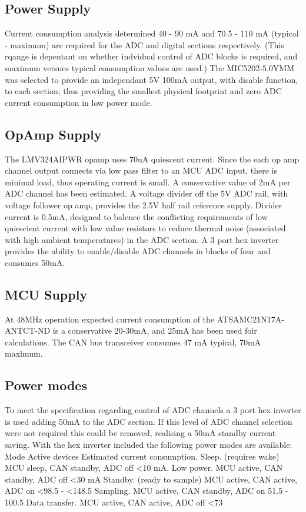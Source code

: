 \subsection{Power Supply}
Current consumption analysis determined 40 - 90 mA and 70.5 - 110 mA (typical - maximum) are required for the ADC and digital sections respectively. (This rqange is depentant on whether indvidual control of ADC blocks is required, and maximum versues typical consumption values are used.) 
The MIC5202-5.0YMM was selected to provide an independant 5V 100mA output, with disable function, to each section; thus providing the smallest physical footprint and zero ADC current consumption in low power mode.
 
\subsection{OpAmp Supply}
The LMV324AIPWR opamp uses 70uA quiescent current. Since the each op amp channel output connects via low pass filter to an MCU ADC input, there is minimal load, thus operating current is small. A conservative value of 2mA per ADC channel has been estimated.
A voltage divider off the 5V ADC rail, with voltage follower op amp, provides the 2.5V half rail reference supply. Divider current is 0.5mA, designed to balence the conflicting requirements of low quiescient current with low value resistors to reduce thermal noise (associated with high ambient temperatures) in the ADC section.
A 3 port hex inverter provides the ability to enable/disable ADC channels in blocks of four and consumes 50mA.

\subsection{MCU Supply}
At 48MHz operation expected current consumption of the ATSAMC21N17A-ANTCT-ND is a conservative 20-30mA, and 25mA has been used foir calculations. The CAN bus transceiver consumes 47 mA typical, 70mA maxlmum.

\subsection{Power modes}
To meet the specification regarding control of ADC channels a 3 port hex inverter is used adding 50mA to the ADC section. If this level of ADC channel selection were not required this could be removed, realising a 50mA standby current saving. With the hex inverter included the following power modes are available:
Mode							Active devices	 					Estimated current consumption.
Sleep. (requires wake)				MCU sleep, CAN standby, ADC off 		<10 mA. 
Low power. 						MCU active, CAN standby, ADC off		<30 mA
Standby. (ready to sample)		MCU active, CAN active, ADC on		<98.5 - <148.5
Sampling.						MCU active, CAN standby, ADC on		51.5 - 100.5 	
Data transfer.					MCU active, CAN active, ADC off		<73